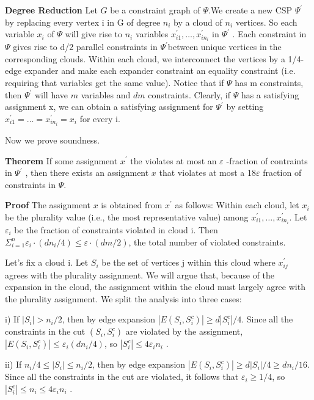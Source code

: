 \textbf{Degree Reduction}
Let $G$ be a constraint graph of $\Psi$.We create a new CSP $\Psi^{'}$ by replacing every vertex i in G of
degree $n_i$ by a cloud of $n_i$ vertices. So each variable $x_i$ of $\Psi$ will give rise to $n_i$ variables $x^{'}_{i1} , \ldots , x^{'}_{in_{i}}$ in $\Psi^{'}$ . Each constraint in $\Psi$ gives rise to d/2 parallel constraints in $\Psi^{'}$between unique vertices in
the corresponding clouds. Within each cloud, we interconnect the vertices by a 1/4-edge expander
and make each expander constraint an equality constraint (i.e. requiring that variables get the
same value). Notice that if $\Psi$ has m constraints, then $\Psi^{'}$ will have $m$ variables and $dm$ constraints.
\newline Clearly, if $\Psi$  has a satisfying assignment x, we can obtain a satisfying assignment for $\Psi^{'}$ by setting
$x^{'}_{i1} = \ldots = x^{'}_{in_{i}}= x_i$ for every i.

Now we prove soundness.

\textbf {Theorem}
If some assignment $x^{'}$ the violates at most an $\varepsilon$ -fraction of contraints in $\Psi^{'}$  , then there
exists an assignment $x$ that violates at most a 18$\varepsilon $ fraction of constraints in $\Psi$.

\textbf {Proof}
The assignment $x$ is obtained from $x^{'}$ as follows: Within each cloud, let $x_i$ be the plurality value (i.e.,
the most representative value) among $x^{'}_{i1} , \ldots , x^{'}_{in_{i}}$. Let $\varepsilon_{i}$ be the fraction of constraints violated in cloud i. Then $\Sigma_{i=1}^{n} \varepsilon_i · (dn_{i} /4) ≤ \varepsilon ·(dm/2)$, the total number of violated constraints.

Let’s fix a cloud i. Let $S_i$ be the set of vertices j within this cloud where $x_{ij}^{'}$ agrees with the
plurality assignment. We will argue that, because of the expansion in the cloud, the assignment
within the cloud must largely agree with the plurality assignment. We split the analysis into three
cases:

 i) If $|S_i| > n_i/2$, then by edge expansion $|E(S_i , S_{i}^{c} )| \geq  d|S_{i}^{c}|/4$. Since all the constraints in the cut $(S_i , S_{i}^{c} )$ are violated by the assignment, $|E(S_i , S_{i}^{c} )| \leq  \varepsilon_{i}(dn_i/4)$, so $|S_{i}^{c}| \leq  4ε_i n_i$ .

 ii) If $n_i/4 \leq  |S_i|\leq   n_i/2$, then by edge expansion $|E(S_i , S_{i}^{c} )| \geq  d|S_i|/4 \geq dn_i/16$. Since all the
constraints in the cut are violated, it follows that $\varepsilon_{i} \geq 1/4$, so $|S_{i}^{c}| \leq  n_i \leq 4\varepsilon_i n_i$ .

